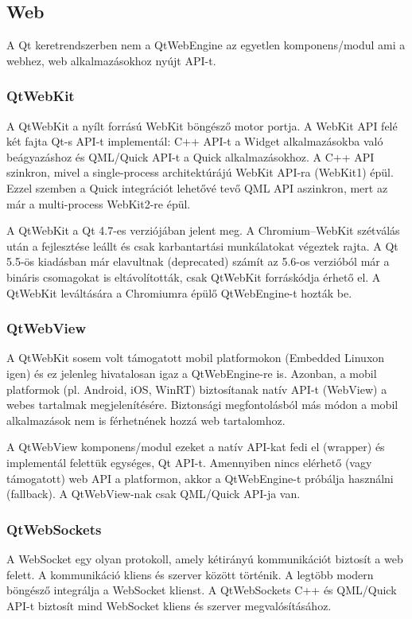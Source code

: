 \documentclass[12pt]{report}
\begin{document}
\subsection{Web}
A Qt keretrendszerben nem a QtWebEngine az egyetlen komponens/modul ami a
webhez, web alkalmazásokhoz nyújt API-t.

\subsubsection{QtWebKit}
A QtWebKit a nyílt forrású WebKit böngésző motor portja. A WebKit API felé két fajta Qt-s
API-t implementál: C++ API-t a Widget alkalmazásokba való beágyazáshoz és QML/Quick API-t a
Quick alkalmazásokhoz. A C++ API szinkron, mivel a single-process architektúrájú WebKit
API-ra (WebKit1) épül. Ezzel szemben a Quick integrációt lehetővé tevő QML API aszinkron,
mert az már a multi-process WebKit2-re épül.

A QtWebKit a Qt 4.7-es verziójában jelent meg. A Chromium--WebKit szétválás után a
fejlesztése leállt és csak karbantartási munkálatokat végeztek rajta. A Qt 5.5-ös kiadásban
már elavultnak (deprecated) számít az 5.6-os verzióból már a bináris csomagokat is
eltávolították, csak QtWebKit forráskódja érhető el. A QtWebKit leváltására a Chromiumra
épülő QtWebEngine-t hozták be.

\subsubsection{QtWebView}
A QtWebKit sosem volt támogatott mobil platformokon (Embedded Linuxon igen) és ez jelenleg
hivatalosan igaz a QtWebEngine-re is. Azonban, a mobil platformok (pl. Android, iOS, WinRT)
biztosítanak natív API-t (WebView) a webes tartalmak megjelenítésére. Biztonsági
megfontolásból más módon a mobil alkalmazások nem is férhetnének hozzá web tartalomhoz.

A QtWebView komponens/modul \cite{bib:qt-doc-qt-webview} ezeket a natív API-kat fedi el
(wrapper) és implementál felettük egységes, Qt API-t. Amennyiben nincs elérhető (vagy
támogatott) web API a platformon, akkor a QtWebEngine-t próbálja használni (fallback).
A QtWebView-nak csak QML/Quick API-ja van.

\subsubsection{QtWebSockets}
A WebSocket egy olyan protokoll, amely kétirányú kommunikációt biztosít a web felett.
A kommunikáció kliens és szerver között történik. A legtöbb modern böngésző integrálja a
WebSocket klienst. A QtWebSockets \cite{bib:qt-doc-qt-websockets} C++ és QML/Quick API-t
biztosít mind WebSocket kliens és szerver megvalósításához.
\end{document}
